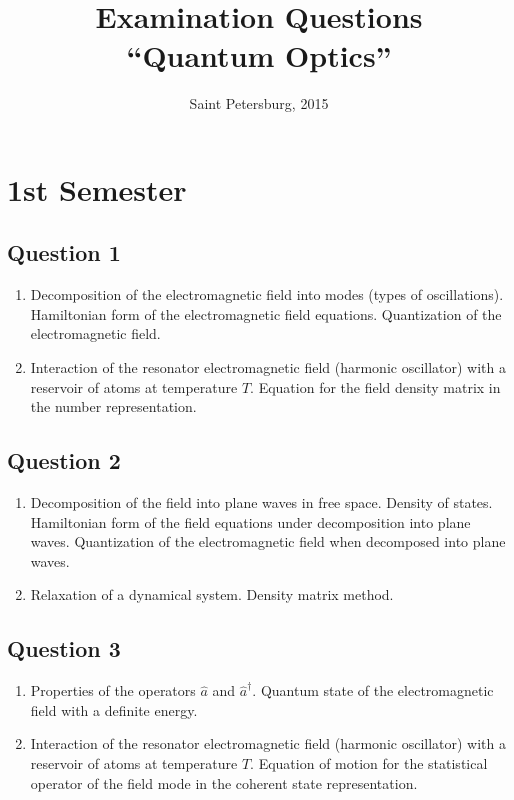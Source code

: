 \documentclass[12pt,a4paper]{article}
\begin{document}
\Russian

\title{Examination Questions \\ ``Quantum Optics''}
\author{}
\date{Saint Petersburg, 2015}
\maketitle
\newpage


\section*{1st Semester}

\subsection*{Question 1} 
\begin{enumerate}
\item Decomposition of the electromagnetic field into modes (types of oscillations).
Hamiltonian form of the electromagnetic field equations. Quantization
of the electromagnetic field. 
\item Interaction of the resonator electromagnetic field
  (harmonic oscillator) with a reservoir of atoms at temperature $T$. Equation for the field density matrix in the number representation.
\end{enumerate}

\subsection*{Question 2} 
\begin{enumerate}
\item Decomposition of the field into plane waves in free space. 
Density of states. Hamiltonian form of the field equations under decomposition into plane waves. Quantization of the electromagnetic field when decomposed into plane waves.
\item Relaxation of a dynamical system. Density matrix method. 
\end{enumerate}

\subsection*{Question 3} 
\begin{enumerate}
\item Properties of the operators $ \hat a $ and $ \hat a ^\dag $. Quantum
state of the electromagnetic field with a definite energy. 
\item Interaction of the resonator electromagnetic field
  (harmonic oscillator) with a reservoir of atoms at temperature $T$. Equation of motion for the statistical operator of the field mode in the coherent state representation.
\end{enumerate}
\end{document}
